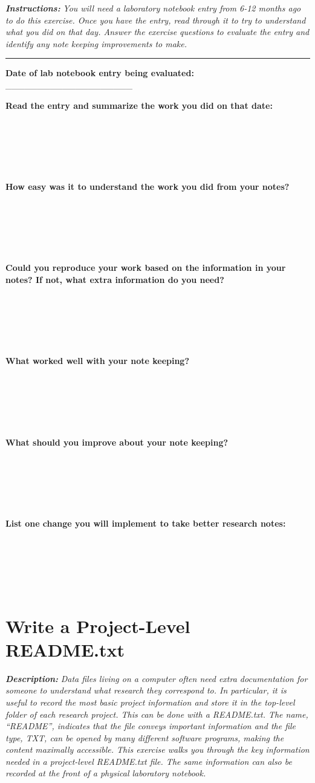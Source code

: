 \documentclass[
]{book}
\begin{document}
\textbf{\emph{Instructions:}} \emph{You will need a laboratory notebook entry from 6-12 months ago to do this exercise. Once you have the entry, read through it to try to understand what you did on that day. Answer the exercise questions to evaluate the entry and identify any note keeping improvements to make.}

\begin{center}\rule{0.5\linewidth}{0.5pt}\end{center}

\textbf{Date of lab notebook entry being evaluated:} \_\_\_\_\_\_\_\_\_\_\_\_\_\_\_\_\_\_\_\_

\textbf{Read the entry and summarize the work you did on that date:}

~

~

~

\textbf{How easy was it to understand the work you did from your notes?}

~

~

~

\textbf{Could you reproduce your work based on the information in your notes? If not, what extra information do you need?}

~

~

~

\textbf{What worked well with your note keeping?}

~

~

~

\textbf{What should you improve about your note keeping?}

~

~

~

\textbf{List one change you will implement to take better research notes:}

~

~

~

\hypertarget{readme-txt}{%
\section{Write a Project-Level README.txt}\label{readme-txt}}

\textbf{\emph{Description:}} \emph{Data files living on a computer often need extra documentation for someone to understand what research they correspond to. In particular, it is useful to record the most basic project information and store it in the top-level folder of each research project. This can be done with a README.txt. The name, ``README'', indicates that the file conveys important information and the file type, TXT, can be opened by many different software programs, making the content maximally accessible. This exercise walks you through the key information needed in a project-level README.txt file. The same information can also be recorded at the front of a physical laboratory notebook.}
\end{document}
